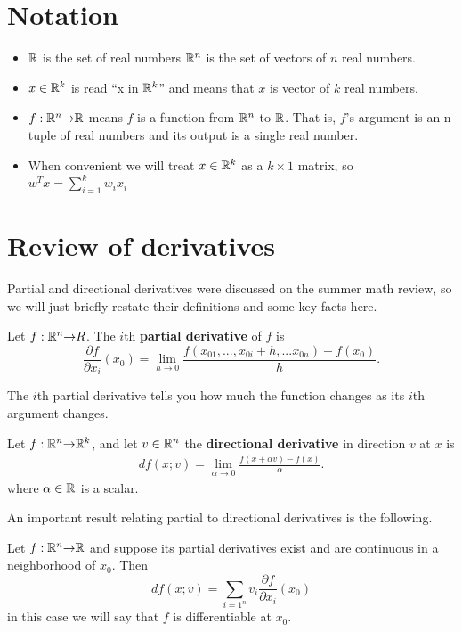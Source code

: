 \section{Notation \label{sec:notation}}
\begin{itemize}
\item $\mathbb{R}$ is the set of real numbers $\mathbb{R}^n$ is the set of
  vectors of $n$ real numbers.
\item $x \in \mathbb{R}^k$ is read ``x in $\mathbb{R}^k$'' and means that $x$ is
  vector of $k$ real numbers.
\item $f: \mathbb{R}^n {\rightarrow} \mathbb{R}$ means $f$ is a function from $\mathbb{R}^n$ to
  $\mathbb{R}$. That is, $f$'s argument is an n-tuple of real numbers and
  its output is a single real number.
\item When convenient we will treat $x \in \mathbb{R}^k$ as a $k \times 1$
  matrix, so $w^T x = \sum_{i=1}^k w_i x_i$
\end{itemize}


\section{Review of derivatives \label{sec:derivatives}}
Partial and directional derivatives were discussed on the summer math
review, so we will just briefly restate their definitions and some key
facts here.
\begin{definition}
  Let $f:\mathbb{R}^n {\rightarrow} R$. The $i$th \textbf{partial derivative} of $f$
  is
  \[ \frac{\partial f}{\partial x_i} (x_0) = \lim_{h \to 0}
  \frac{f(x_{01},...,x_{0i}+h, ... x_{0n}) - f(x_0) }{h}. \]
\end{definition}
The $i$th partial derivative tells you how much the function changes
as its $i$th argument changes. 
\begin{definition}
  Let $f: \mathbb{R}^n {\rightarrow} \mathbb{R}^k$, and let $v \in \mathbb{R}^n$ the \textbf{directional
    derivative} in direction $v$ at $x$ is
  \begin{align*}
    df(x;v) = \lim_{\alpha \to 0} \frac{f(x + \alpha v) - f(x)}{\alpha}.
  \end{align*}  
  where $\alpha \in \mathbb{R}$ is a scalar.
\end{definition}
An important result relating partial to directional derivatives is the
following.
\begin{theorem}\label{thm:pddiff}
  Let $f:\mathbb{R}^n {\rightarrow} \mathbb{R}$ and suppose its partial derivatives exist and
  are continuous in a neighborhood of $x_0$. Then
  \[ df(x;v) = \sum_{i=1^n} v_i \frac{\partial f}{\partial x_i}
  (x_0) \]
  in this case we will say that $f$ is differentiable at $x_0$.
\end{theorem}

